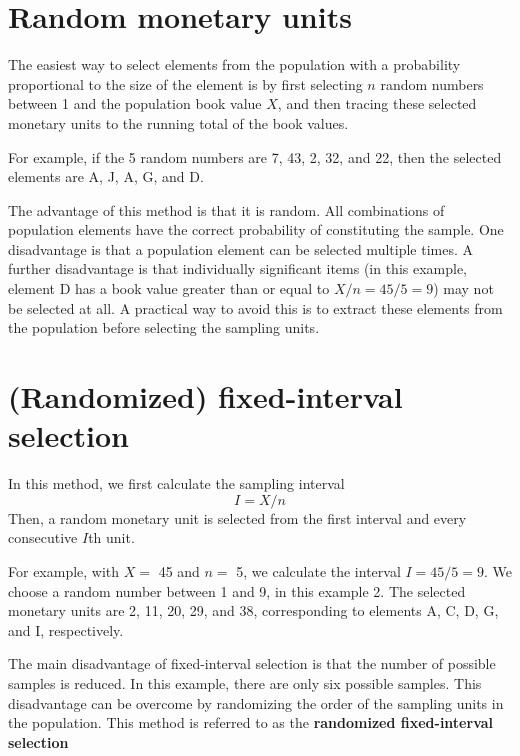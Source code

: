 \documentclass[12pt,a4paper]{memoir}
\begin{document}
\section{Random monetary units} \label{par:random_monetary_units}The easiest way to select elements from the population with a probability proportional to the size of the element is by first selecting $n$ random numbers between 1 and the population book value $X$, and then tracing these selected monetary units to the running total of the book values.  

For example, if the 5 random numbers are 7, 43, 2, 32, and 22, then the selected elements are A, J, A, G, and D. 

The advantage of this method is that it is random. All combinations of population elements have the correct probability of constituting the sample. One disadvantage is that a population element can be selected multiple times. A further disadvantage is that individually significant items (in this example, element D has a book value greater than or equal to $X/n = 45/5 = 9$) may not be selected at all. A practical way to avoid this is to extract these elements from the population before selecting the sampling units.

\section{(Randomized) fixed-interval selection}\label{par:fixed_interval_selection} In this method, we first calculate the sampling interval 
\begin{equation}
I = X / n
\label{eq:sampling_interval}
\end{equation}
Then, a random monetary unit is selected from the first interval and every consecutive $I$th unit.

For example, with $X =$ 45 and $n =$ 5, we calculate the interval $I = 45/5 =9$. We choose a random number between 1 and 9, in this example 2. The selected monetary units are 2, 11, 20, 29, and 38, corresponding to elements A, C, D, G, and I, respectively.

The main disadvantage of fixed-interval selection is that the number of possible samples is reduced. In this example, there are only six possible samples. This disadvantage can be overcome by randomizing the order of the sampling units in the population. This method is referred to as the \textbf{randomized fixed-interval selection} 
\end{document}
